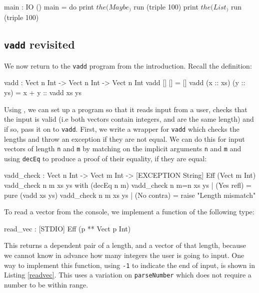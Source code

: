 \begin{code}
main : IO ()
main = do print $ the (Maybe _) $ run (triple 100)
          print $ the (List _) $ run (triple 100)
\end{code}

\subsection{\texttt{vadd} revisited}

We now return to the \texttt{vadd} program from the introduction. Recall the
definition:

\begin{code}
vadd : Vect n Int -> Vect n Int -> Vect n Int
vadd []        []        = []
vadd (x :: xs) (y :: ys) = x + y :: vadd xs ys
\end{code}

\noindent
Using \effects{}, we can set up a program so that it reads input from a user,
checks that the input is valid (i.e both vectors contain integers, and are
the same length) and if so, pass it on to \texttt{vadd}. First, we write
a wrapper for \texttt{vadd} which checks the lengths and throw an exception
if they are not equal. We can do this for input vectors of length \texttt{n}
and \texttt{m} by matching on the implicit arguments \texttt{n} and
\texttt{m} and using \texttt{decEq} to produce a proof of their equality,
if they are equal:

\begin{code}
vadd_check : Vect n Int -> Vect m Int ->
             { [EXCEPTION String] } Eff (Vect m Int)
vadd_check {n} {m} xs ys with (decEq n m)
  vadd_check {n} {m=n} xs ys | (Yes refl) = pure (vadd xs ys)
  vadd_check {n} {m}   xs ys | (No contra) = raise "Length mismatch"
\end{code}

\noindent
To read a vector from the console, we implement a function of the following
type:

\begin{code}
read_vec : { [STDIO] } Eff (p ** Vect p Int)
\end{code}

\noindent
This returns a dependent pair of a length, and a vector of that length, because
we cannot know in advance how many integers the user is going to input.
One way to implement this function, using \texttt{-1} to indicate the end
of input, is shown in Listing \ref{readvec}. This uses a variation on
\texttt{parseNumber} which does not require a number to be within range.

